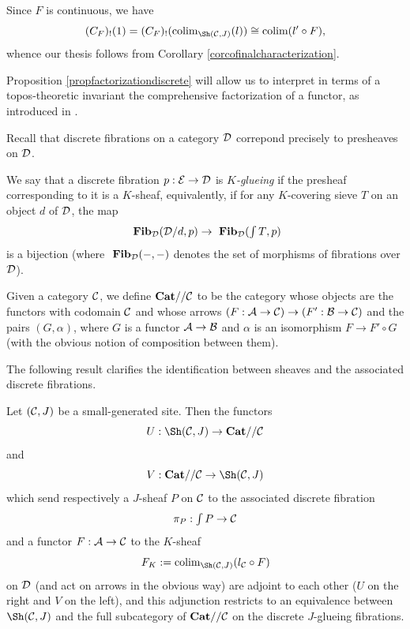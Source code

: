 \documentclass[a4paper,12pt]{article}
\begin{document}
\begin{proofs}
Since $F$ is continuous, we have  $$(C_{F})_{!}(1)=(C_{F})_{!}(\textup{colim}_{\Sh({\cal C}, J)}(l))\cong \textup{colim}(l'\circ F),$$ whence our thesis follows from Corollary \ref{corcofinalcharacterization}.	
\end{proofs}

Proposition \ref{propfactorizationdiscrete} will allow us to interpret in terms of a topos-theoretic invariant the comprehensive factorization of a functor, as introduced in \cite{RossWalters}. 

Recall that discrete fibrations on a category $\cal D$ correpond precisely to presheaves on $\cal D$. 

\begin{definition}
	We say that a discrete fibration $p:{\cal E}\to {\cal D}$ is \emph{$K$-glueing} if the presheaf corresponding to it is a $K$-sheaf, equivalently, if for any $K$-covering sieve $T$ on an object $d$ of $\cal D$, the map
	\[
	\textup{ \bf Fib}_{\cal D}({\cal D}\slash d, p) \to \textup{ \bf Fib}_{\cal D}({\textstyle \int T}, p)
	\] 
	is a bijection (where $\textup{ \bf Fib}_{\cal D}(-,-)$ denotes the set of morphisms of fibrations over $\cal D$). 
\end{definition}

Given a category $\cal C$, we define $\textbf{Cat}\slash\slash {\cal C}$ to be the category whose objects are the functors with codomain $\cal C$ and whose arrows $(F:{\cal A}\to {\cal C}) \to (F':{\cal B} \to {\cal C})$ and the pairs $(G, \alpha)$, where $G$ is a functor ${\cal A}\to {\cal B}$ and $\alpha$ is an isomorphism $F \to F'\circ G$ (with the obvious notion of composition between them).  

The following result clarifies the identification between sheaves and the associated discrete fibrations. 

\begin{proposition}\label{propadjunctiondiscrete}
Let $({\cal C}, J)$ be a small-generated site. Then	the functors 
\[
U:\Sh({\cal C}, J)\to \textup{\bf Cat}\slash\slash {\cal C}
\]
and
\[
V:\textup{\bf Cat}\slash\slash {\cal C} \to \Sh({\cal C}, J)
\]
which send respectively a $J$-sheaf $P$ on $\cal C$ to the associated discrete fibration $$\pi_{P}:{\textstyle \int P}\to {\cal C}$$ and a functor $F:{\cal A}\to {\cal C}$ to the $K$-sheaf $$F_{K}:=\textup{colim}_{\Sh({\cal C}, J)}(l_{\cal C}\circ F)$$ on $\cal D$ (and act on arrows in the obvious way) are adjoint to each other ($U$ on the right and $V$ on the left), and this adjunction restricts to an equivalence between $\Sh({\cal C}, J)$ and the full subcategory of $\textup{\bf Cat} \slash\slash {\cal C}$ on the discrete $J$-glueing fibrations.  
\end{proposition}
\end{document}
